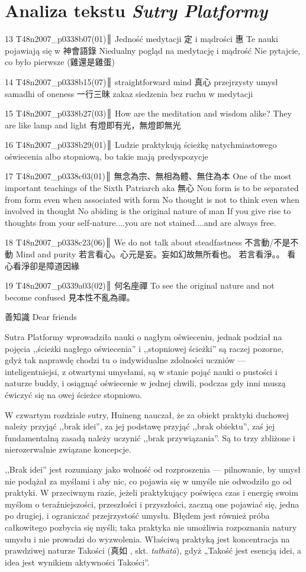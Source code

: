 \chapter{Analiza tekstu \textit{Sutry Platformy}}

13 T48n2007_p0338b07(01)║
Jedność medytacji 定 i mądrości 惠
Te nauki pojawiają się w 神會語錄
Niedualny pogląd na medytację i mądrość
Nie pytajcie, co było pierwsze (雞還是雞蛋)

14 T48n2007_p0338b15(07)║
straightforward mind 真心 przejrzysty umysł
samadhi of oneness 一行三昧
zakaz siedzenia bez ruchu w medytacji

15 T48n2007_p0338b27(03)║
How are the meditation and wisdom alike?
They are like lamp and light
有燈即有光，無燈即無光

16 T48n2007_p0338b29(01)║
Ludzie praktykują ścieżkę natychmiastowego oświecenia albo stopniową, bo takie mają predyspozycje

17 T48n2007_p0338c03(01)║
無念為宗、無相為體、無住為本
One of the most important teachings of the Sixth Patriarch
aka 無心
Non form is to be separated from form even when associated with form
No thought is not to think even when involved in thought
No abiding is the original nature of man
If you give rise to thoughts from your self-nature....you are not stained....and are always free.

18 T48n2007_p0338c23(06)║
We do not talk about steadfastness 不言動/不是不動
Mind and purity
若言看心。心元是妄。妄如幻故無所看也。
若言看淨。。
看心看淨卻是障道因緣

19 T48n2007_p0339a03(02)║
何名座禪
To see the original nature and not become confused
見本性不亂為禪。

善知識 Dear friends
\fi

Sutra Platformy wprowadziła nauki o nagłym oświeceniu, jednak podział na pojęcia ,,ścieżki nagłego oświecenia'' i ,,stopniowej ścieżki'' są raczej pozorne, gdyż tak naprawdę chodzi tu o indywidualne zdolności uczniów --- inteligentniejsi, z otwartymi umysłami, są w stanie pojąć nauki o pustości i naturze buddy, i osiągnąć oświecenie w jednej chwili, podczas gdy inni muszą ćwiczyć się na owej ścieżce stopniowo.

W czwartym rozdziale sutry, Huineng nauczał, że za obiekt praktyki duchowej należy przyjąć ,,brak idei'', za jej podstawę przyjąć ,,brak obiektu'', zaś jej fundamentalną zasadą należy uczynić ,,brak przywiązania''. Są to trzy zbliżone i nierozerwalnie związane koncepcje.

,,Brak idei'' jest rozumiany jako wolność od rozproszenia --- pilnowanie, by umysł nie podążał za myślami i aby nic, co pojawia się w umyśle nie odwodziło go od praktyki. W przeciwnym razie, jeżeli praktykujący poświęca czas i energię swoim myślom o teraźniejszości, przeszłości i przyszłości, zaczną one pojawiać się, jedna po drugiej, i ograniczać przejrzystość umysłu. Błędem jest również próba całkowitego pozbycia się myśli; taka praktyka nie umożliwia rozpoznania natury umysłu i nie prowadzi do wyzwolenia. Właściwą praktyką jest koncentracja na prawdziwej naturze Takości (真如 , skt. \textit{tathātā}), gdyż „Takość jest esencją idei, a idea jest wynikiem aktywności Takości”.

